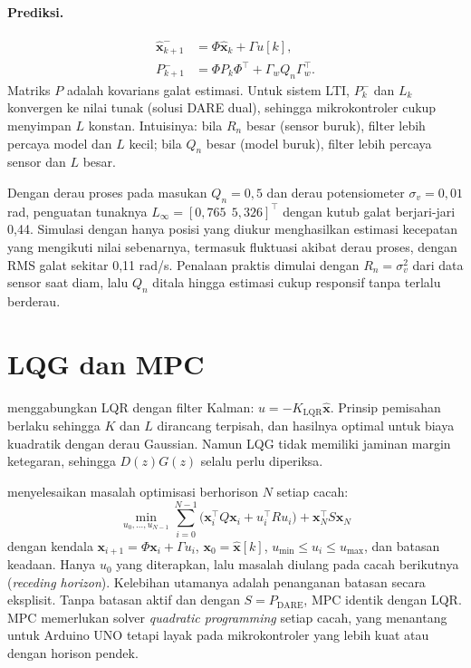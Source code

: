\paragraph{Prediksi.}
\begin{align}
	\hat{\mathbf{x}}_{k+1}^- &= \Phi\hat{\mathbf{x}}_k + \Gamma u[k],\\
	P_{k+1}^- &= \Phi P_k\Phi^\top + \Gamma_wQ_n\Gamma_w^\top.
\end{align}
Matriks $P$ adalah kovarians galat estimasi. Untuk sistem LTI, $P_k^-$ dan $L_k$ konvergen ke nilai tunak (solusi DARE dual), sehingga mikrokontroler cukup menyimpan $L$ konstan. Intuisinya: bila $R_n$ besar (sensor buruk), filter lebih percaya model dan $L$ kecil; bila $Q_n$ besar (model buruk), filter lebih percaya sensor dan $L$ besar.

\begin{contoh}
	Dengan derau proses pada masukan $Q_n = 0{,}5$ dan derau potensiometer $\sigma_v = 0{,}01$ rad, penguatan tunaknya $L_\infty = [0{,}765\ \ 5{,}326]^\top$ dengan kutub galat berjari-jari 0,44. Simulasi dengan hanya posisi yang diukur menghasilkan estimasi kecepatan yang mengikuti nilai sebenarnya, termasuk fluktuasi akibat derau proses, dengan RMS galat sekitar 0,11 rad/s. Penalaan praktis dimulai dengan $R_n = \sigma_v^2$ dari data sensor saat diam, lalu $Q_n$ ditala hingga estimasi cukup responsif tanpa terlalu berderau.
\end{contoh}

\section{LQG dan MPC}
 menggabungkan LQR dengan filter Kalman: $u = -K_{\text{LQR}}\hat{\mathbf{x}}$. Prinsip pemisahan berlaku sehingga $K$ dan $L$ dirancang terpisah, dan hasilnya optimal untuk biaya kuadratik dengan derau Gaussian. Namun LQG tidak memiliki jaminan margin ketegaran, sehingga $D(z)G(z)$ selalu perlu diperiksa.

 menyelesaikan masalah optimisasi berhorison $N$ setiap cacah:
\begin{equation}
	\min_{u_0,\dots,u_{N-1}}\sum_{i=0}^{N-1}\big(\mathbf{x}_i^\top Q\mathbf{x}_i + u_i^\top Ru_i\big) + \mathbf{x}_N^\top S\mathbf{x}_N
\end{equation}
dengan kendala $\mathbf{x}_{i+1} = \Phi\mathbf{x}_i + \Gamma u_i$, $\mathbf{x}_0 = \hat{\mathbf{x}}[k]$, $u_{\min} \le u_i \le u_{\max}$, dan batasan keadaan. Hanya $u_0$ yang diterapkan, lalu masalah diulang pada cacah berikutnya (\textit{receding horizon}). Kelebihan utamanya adalah penanganan batasan secara eksplisit. Tanpa batasan aktif dan dengan $S = P_{\text{DARE}}$, MPC identik dengan LQR. MPC memerlukan solver \textit{quadratic programming} setiap cacah, yang menantang untuk Arduino UNO tetapi layak pada mikrokontroler yang lebih kuat atau dengan horison pendek.

